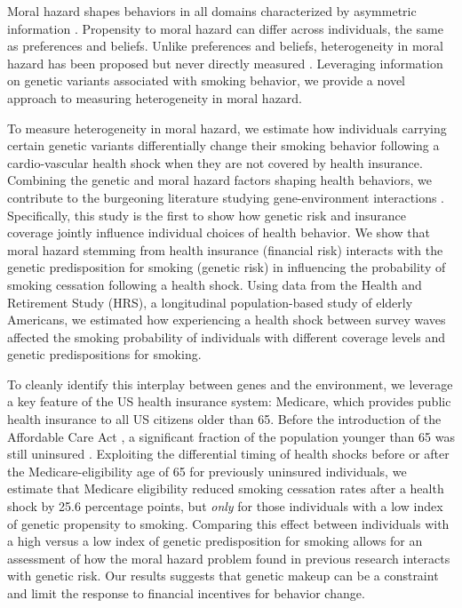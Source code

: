 \documentclass[11pt]{article}
\begin{document}
Moral hazard shapes behaviors in all domains characterized by asymmetric information \citep{Arrow1963,Finkelstein2014}.
Propensity to moral hazard can differ across individuals, the same as preferences and beliefs.
Unlike preferences and beliefs, heterogeneity in moral hazard has been proposed but never directly measured \citep{Einav2013,Dubois2009,Kowalski2018moral}.
Leveraging information on genetic variants associated with smoking behavior, we provide a novel approach to measuring heterogeneity in moral hazard.

To measure heterogeneity in moral hazard, we estimate how individuals carrying certain genetic variants differentially change their smoking behavior following a cardio-vascular health shock when they are not covered by health insurance.
Combining the genetic and moral hazard factors shaping health behaviors, we contribute to the burgeoning literature studying gene-environment interactions \citep{Caspi2002,Fletcher2012,Barcellos2018,Belsky2018mobility,Schmitz2017,Schmitz2017vietnam,Wedow2018,Papageorge2020}. %
Specifically, this study is the first to show how genetic risk and insurance coverage jointly influence individual choices of health behavior.
We show that moral hazard stemming from health insurance (financial risk) interacts with the genetic predisposition for smoking (genetic risk) in influencing the probability of smoking cessation following a health shock.
Using data from the Health and Retirement Study (HRS), a longitudinal population-based study of elderly Americans, we estimated how experiencing a health shock between survey waves affected the smoking probability of individuals with different coverage levels and genetic predispositions for smoking.

To cleanly identify this interplay between genes and the environment, we leverage a key feature of the US health insurance system: Medicare, which provides public health insurance to all US citizens older than 65.
Before the introduction of the Affordable Care Act \citep{Obama2016}, a significant fraction of the population younger than 65 was still uninsured \citep{Cohen2009,Barnett2016}.
Exploiting the differential timing of health shocks before or after the Medicare-eligibility age of 65 for previously uninsured individuals, we estimate that Medicare eligibility reduced smoking cessation rates after a health shock by 25.6 percentage points, but \textit{only} for those individuals with a low index of genetic propensity to smoking.
Comparing this effect between individuals with a high versus a low index of genetic predisposition for smoking allows for an assessment of how the moral hazard problem found in previous research interacts with genetic risk.
Our results suggests that genetic makeup can be a constraint and limit the response to financial incentives for behavior change.
\end{document}
